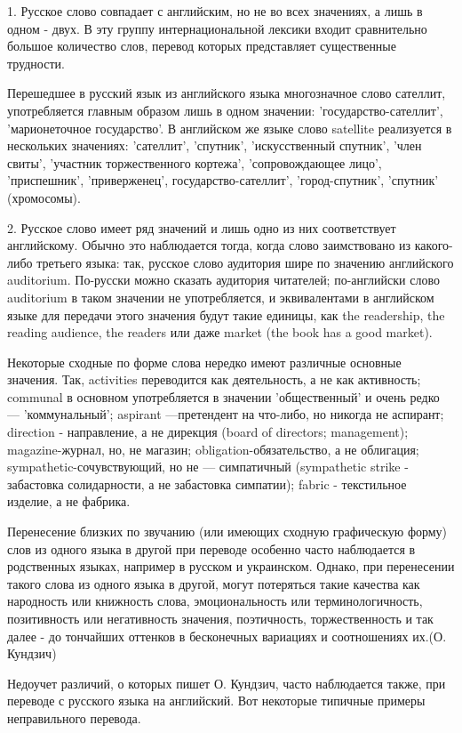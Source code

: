 1. Русское слово совпадает с английским, но не во всех значениях, а лишь в одном - двух. В эту группу интернациональной лексики входит сравнительно большое количество слов, перевод которых представляет существенные трудности.

Перешедшее в русский язык из английского языка многозначное слово сателлит, употребляется главным образом лишь в одном значении: 'государство-сателлит', 'марионеточное государство'. В английском же языке слово satellite реализуется в нескольких значениях: 'сателлит', 'спутник', 'искусственный спутник', 'член свиты', 'участник торжественного кортежа', 'сопровождающее лицо', 'приспешник', 'приверженец', государство-сателлит', 'город-спутник', 'спутник' (хромосомы).

2. Русское слово имеет ряд значений и лишь одно из них соответствует английскому. Обычно это наблюдается тогда, когда слово заимствовано из какого-либо третьего языка: так, русское слово аудитория шире по значению английского auditorium. По-русски можно сказать аудитория читателей; по-английски слово auditorium в таком значении не употребляется, и эквивалентами в английском языке для передачи этого значения будут такие единицы, как the readership, the reading audience, the readers или даже market (the book has a good market).

Некоторые сходные по форме слова нередко имеют различные основные значения. Так, activities переводится как деятельность, а не как активность; communal в основном употребляется в значении 'общественный' и очень редко --- 'коммунальный'; aspirant ---претендент на что-либо, но никогда не аспирант; direction - направление, а не дирекция (board of directors; management); magazine-журнал, но, не магазин; obligation-обязательство, а не облигация; sympathetic-сочувствующий, но не --- симпатичный (sympathetic strike - забастовка солидарности, а не забастовка симпатии); fabric - текстильное изделие, а не фабрика.

Перенесение близких по звучанию (или имеющих сходную графическую форму) слов из одного языка в другой при переводе особенно часто наблюдается в родственных языках, например в русском и украинском. Однако, при перенесении такого слова из одного языка в другой, могут потеряться такие качества как народность или книжность слова, эмоциональность или терминологичность, позитивность или негативность значения, поэтичность, торжественность и так далее - до тончайших оттенков в бесконечных вариациях и соотношениях их.(О. Кундзич)

Недоучет различий, о которых пишет О. Кундзич, часто наблюдается также, при переводе с русского языка на английский. Вот некоторые типичные примеры неправильного перевода.

